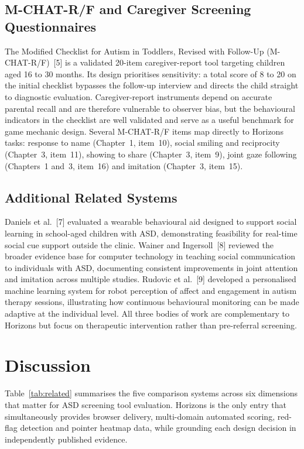 \documentclass[12pt,a4paper,oneside]{report}
\begin{document}
\subsection{M-CHAT-R/F and Caregiver Screening Questionnaires}

The Modified Checklist for Autism in Toddlers, Revised with Follow-Up (M-CHAT-R/F)~[5] is a validated 20-item caregiver-report tool targeting children aged 16 to 30 months. Its design prioritises sensitivity: a total score of 8 to 20 on the initial checklist bypasses the follow-up interview and directs the child straight to diagnostic evaluation. Caregiver-report instruments depend on accurate parental recall and are therefore vulnerable to observer bias, but the behavioural indicators in the checklist are well validated and serve as a useful benchmark for game mechanic design. Several M-CHAT-R/F items map directly to Horizons tasks: response to name (Chapter~1, item~10), social smiling and reciprocity (Chapter~3, item~11), showing to share (Chapter~3, item~9), joint gaze following (Chapters~1 and~3, item~16) and imitation (Chapter~3, item~15).

\subsection{Additional Related Systems}

Daniels et al.~[7] evaluated a wearable behavioural aid designed to support social learning in school-aged children with ASD, demonstrating feasibility for real-time social cue support outside the clinic. Wainer and Ingersoll~[8] reviewed the broader evidence base for computer technology in teaching social communication to individuals with ASD, documenting consistent improvements in joint attention and imitation across multiple studies. Rudovic et al.~[9] developed a personalised machine learning system for robot perception of affect and engagement in autism therapy sessions, illustrating how continuous behavioural monitoring can be made adaptive at the individual level. All three bodies of work are complementary to Horizons but focus on therapeutic intervention rather than pre-referral screening.

\section{Discussion}

Table~\ref{tab:related} summarises the five comparison systems across six dimensions that matter for ASD screening tool evaluation. Horizons is the only entry that simultaneously provides browser delivery, multi-domain automated scoring, red-flag detection and pointer heatmap data, while grounding each design decision in independently published evidence.
\end{document}
